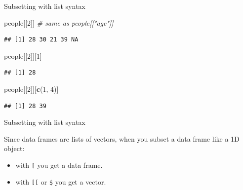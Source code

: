 \documentclass[ignorenonframetext,]{beamer}
\newenvironment{Shaded}{\begin{snugshade}}{\end{snugshade}}
\newcommand{\CommentTok}[1]{\textcolor[rgb]{0.56,0.35,0.01}{\textit{#1}}}
\newcommand{\DecValTok}[1]{\textcolor[rgb]{0.00,0.00,0.81}{#1}}
\newcommand{\KeywordTok}[1]{\textcolor[rgb]{0.13,0.29,0.53}{\textbf{#1}}}
\newcommand{\NormalTok}[1]{#1}
\providecommand{\tightlist}{%
  \setlength{\itemsep}{0pt}\setlength{\parskip}{0pt}}
\begin{document}
\begin{frame}[fragile]{Subsetting with list syntax}
\protect\hypertarget{subsetting-with-list-syntax-4}{}

\begin{Shaded}
\begin{Highlighting}[]
\NormalTok{people[[}\DecValTok{2}\NormalTok{]] }\CommentTok{# same as people[["age"]]}
\end{Highlighting}
\end{Shaded}

\begin{verbatim}
## [1] 28 30 21 39 NA
\end{verbatim}

\begin{Shaded}
\begin{Highlighting}[]
\NormalTok{people[[}\DecValTok{2}\NormalTok{]][}\DecValTok{1}\NormalTok{]}
\end{Highlighting}
\end{Shaded}

\begin{verbatim}
## [1] 28
\end{verbatim}

\begin{Shaded}
\begin{Highlighting}[]
\NormalTok{people[[}\DecValTok{2}\NormalTok{]][}\KeywordTok{c}\NormalTok{(}\DecValTok{1}\NormalTok{, }\DecValTok{4}\NormalTok{)]}
\end{Highlighting}
\end{Shaded}

\begin{verbatim}
## [1] 28 39
\end{verbatim}

\end{frame}

\begin{frame}[fragile]{Subsetting with list syntax}
\protect\hypertarget{subsetting-with-list-syntax-5}{}

Since data frames are lists of vectors, when you subset a data frame
like a 1D object:

\begin{itemize}
\tightlist
\item
  with \texttt{{[}} you get a data frame.
\item
  with \texttt{{[}{[}} or \texttt{\$} you get a vector.
\end{itemize}

\end{frame}
\end{document}
